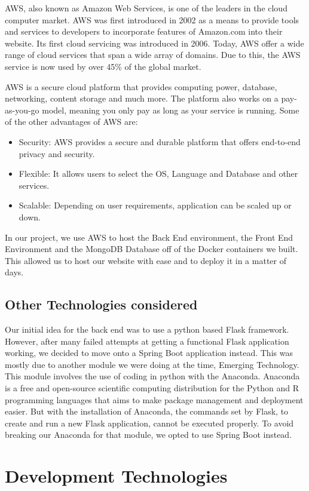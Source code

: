 AWS, also known as Amazon Web Services, is one of the leaders in the cloud computer market. AWS was first introduced in 2002 as a means to provide tools and services to developers to incorporate features of Amazon.com into their website\cite{awsblog}. Its first cloud servicing was introduced in 2006. Today, AWS offer a wide range of cloud services that span a wide array of domains. Due to this, the AWS service is now used by over 45\% of the global market. \par
AWS is a secure cloud platform that provides computing power, database, networking, content storage and much more. The platform also works on a pay-as-you-go model, meaning you only pay as long as your service is running. Some of the other advantages of AWS are:
\begin{itemize}
    \item Security: AWS provides a secure and durable platform that offers end-to-end privacy and security.
    \item Flexible: It allows users to select the OS, Language and Database and other services.
    \item Scalable: Depending on user requirements, application can be scaled up or down.
\end{itemize}
In our project, we use AWS to host the Back End environment, the Front End Environment and the MongoDB Database off of the Docker containers we built. This allowed us to host our website with ease and to deploy it in a matter of days.

\subsection{Other Technologies considered}
Our initial idea for the back end was to use a python based Flask framework. However, after many failed attempts at getting a functional Flask application working, we decided to move onto a Spring Boot application instead. This was mostly due to another module we were doing at the time, Emerging Technology. This module involves the use of coding in python with the Anaconda. Anaconda is a free and open-source scientific computing distribution for the Python and R programming languages that aims to make package management and deployment easier. But with the installation of Anaconda, the commands set by Flask, to create and run a new Flask application, cannot be executed properly. To avoid breaking our Anaconda for that module, we opted to use Spring Boot instead. 

\section{Development Technologies}

